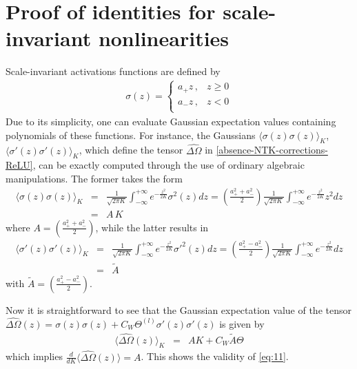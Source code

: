 \section{Proof of identities for scale-invariant nonlinearities}
\label{app:proof-identity-relu}
Scale-invariant activations functions are defined by
\begin{eqnarray}
    \sigma(z) =  \left\{
\begin{array}{ll}
      a_{+}z \, ,& z \geq 0 \\
      a_{-}z \, ,& z < 0 \\
\end{array} 
\right. 
\end{eqnarray}
Due to its simplicity, one can evaluate Gaussian expectation values containing polynomials of these functions. For instance, the Gaussians $\langle \sigma(z)\sigma(z)\rangle_{K}$, $\langle \sigma'(z)\sigma'(z)\rangle_{K}$, which define the tensor $\widehat{\Delta \Omega}$ in \ref{absence-NTK-corrections-ReLU}, can be exactly computed through the use of ordinary algebraic manipulations. The former takes the form
\begin{eqnarray}
    \langle\sigma(z)\sigma(z)\rangle_{K} &=& \frac{1}{\sqrt{2\pi K}}\int_{-\infty}^{+\infty}e^{-\frac{z^{2}}{2K}}\sigma^{2}(z)dz  = \left(\frac{a_{+}^{2} + a_{-}^{2}}{2}\right)\frac{1}{\sqrt{2\pi K}}\int_{-\infty}^{+\infty}e^{-\frac{z^{2}}{2K}}z^{2}dz\nonumber\\
    &=& A\, K
\end{eqnarray}
where $A = \left(\frac{a_{+}^{2} + a_{-}^{2}}{2}\right)$, while the latter results in
\begin{eqnarray}
    \langle\sigma'(z)\sigma'(z)\rangle_{K} &=& \frac{1}{\sqrt{2\pi K}}\int_{-\infty}^{+\infty}e^{-\frac{z^{2}}{2K}}\sigma'^{2}(z)dz  = \left(\frac{a_{+}^{2} - a_{-}^{2}}{2}\right)\frac{1}{\sqrt{2\pi K}}\int_{-\infty}^{+\infty}e^{-\frac{z^{2}}{2K}}dz\nonumber\\
    &=& \tilde{A}
\end{eqnarray} 
with $\tilde{A} = \left(\frac{a_{+}^{2} - a_{-}^{2}}{2}\right)$. 

Now it is straightforward to see that the Gaussian expectation value of the tensor $\widehat{\Delta \Omega}(z) = \sigma(z)\sigma(z) + C_{W} \Theta^{(l)} \sigma'(z)\sigma'(z)$ is given by
\begin{eqnarray}
\langle \widehat{\Delta \Omega}(z)\rangle_{K} &=& A K + C_{W}\tilde{A} \Theta
\end{eqnarray}
which implies $\frac{d}{dK}\langle \widehat{\Delta \Omega}(z)\rangle = A$. This shows the validity of \eqref{eq:11}.

